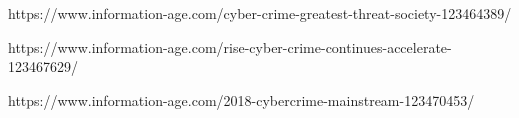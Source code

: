 https://www.information-age.com/cyber-crime-greatest-threat-society-123464389/


https://www.information-age.com/rise-cyber-crime-continues-accelerate-123467629/


https://www.information-age.com/2018-cybercrime-mainstream-123470453/